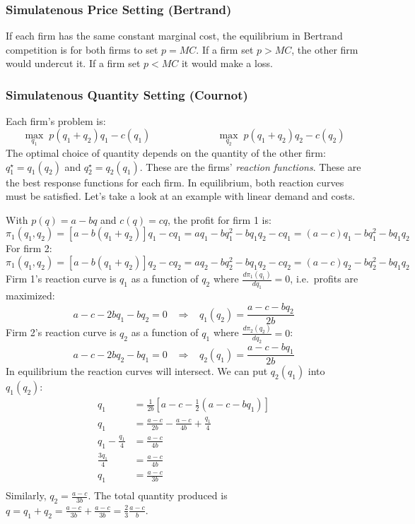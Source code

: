 \documentclass{article}
\begin{document}
\subsubsection*{Simulatenous Price Setting (Bertrand)}
If each firm has the same constant marginal cost, the equilibrium in Bertrand competition is for both firms to set $p=MC$. If a firm set $p>MC$, the other firm would undercut it. If a firm set $p<MC$ it would make a loss.
\subsubsection*{Simulatenous Quantity Setting (Cournot)}
Each firm's problem is:
\[
  \underset{q_1}{\max}\; p\left( q_1+q_2 \right)q_1 - c\left( q_1 \right)
  \;\;\;\;\;\;\;\;\;\;\;\;
  \;\;\;\;\;\;\;\;\;\;\;\;
  \underset{q_2}{\max}\; p\left( q_1+q_2 \right)q_2 - c\left( q_2 \right)
\]
The optimal choice of quantity depends on the quantity of the other firm: $q_1^\star = q_1\left( q_2 \right)$ and $q_2^\star = q_2\left( q_1 \right)$. These are the firms' \emph{reaction functions}. These are the best response functions for each firm. In equilibrium, both reaction curves must be satisfied. Let's take a look at an example with linear demand and costs.

With $p\left( q \right)=a-bq$ and $c\left( q \right)=cq$, the profit for firm 1 is:
\[
  \pi_1\left( q_1,q_2 \right)=\left[ a-b\left( q_1+q_2 \right) \right]q_1 - cq_1=aq_1 - bq_1^2 -b q_1q_2 -cq_1 = \left( a-c \right)q_1 - bq_1^2 - bq_1q_2
\]
For firm 2:
\[
   \pi_1\left( q_1,q_2 \right)=\left[ a-b\left( q_1+q_2 \right) \right]q_2 - cq_2=aq_2 - bq_2^2 -b q_1q_2 -cq_2 = \left( a-c \right)q_2 - bq_2^2 - bq_1q_2
\]
Firm 1's reaction curve is $q_1$ as a function of $q_2$ where $\frac{d\pi_1\left( q_1 \right)}{dq_1}=0$, i.e.~profits are maximized:
\[
  a -c - 2bq_1 -bq_2 = 0 \;\;\;\Longrightarrow \;\;\; q_1\left( q_2 \right) = \frac{a-c-bq_2}{2b}
\]
Firm 2's reaction curve is $q_2$ as a function of $q_1$ where $\frac{d\pi_2\left( q_2 \right)}{dq_2}=0$:
\[
  a-c - 2bq_2 -bq_1 = 0 \;\;\;\Longrightarrow \;\;\; q_2\left( q_1 \right)= \frac{a-c-bq_1}{2b}
\]
In equilibrium the reaction curves will intersect. We can put $q_2\left( q_1 \right)$ into $q_1\left( q_2 \right)$:
\begin{align*}
  q_1&=\frac{1}{2b}\left[ a-c-\frac{1}{2}\left( a-c-bq_1 \right) \right]\\
  q_1&=\frac{a-c}{2b} -\frac{a-c}{4b} + \frac{q_1}{4}\\
  q_1-\frac{q_1}{4}&=\frac{a-c}{4b}\\
  \frac{3q_1}{4}&=\frac{a-c}{4b}\\
  q_1&=\frac{a-c}{3b}\\
\end{align*}
Similarly, $q_2=\frac{a-c}{3b}$. The total quantity produced is $q=q_1+q_2=\frac{a-c}{3b}+\frac{a-c}{3b}=\frac{2}{3}\frac{a-c}{b}$.
\end{document}
